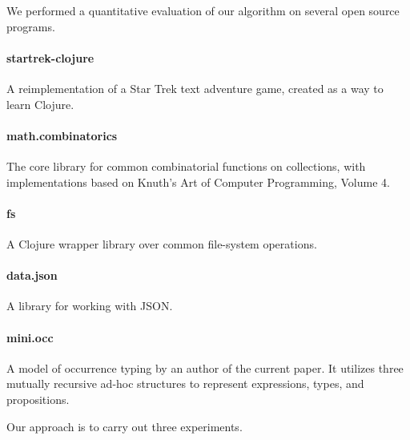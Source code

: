 \label{infer:chap:evaluation}

We performed a quantitative evaluation of our algorithm
on several open source programs.

\paragraph{startrek-clojure}
A reimplementation of a Star Trek text adventure game,
created as a way to learn Clojure.

\paragraph{math.combinatorics}
The core library for common combinatorial functions
on collections,
with implementations based on Knuth's Art of Computer
Programming, Volume 4.

\paragraph{fs}
A Clojure wrapper library over common file-system operations.

\paragraph{data.json}
A library for working with JSON.


\paragraph{mini.occ}
A model of occurrence typing by an author of the
current paper. It utilizes three mutually recursive
ad-hoc structures to represent expressions, types,
and propositions.


Our approach is to carry out three experiments.

